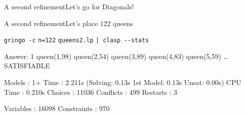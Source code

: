 \begin{frame}[fragile]{A second refinement}{Let's go for Diagonals!}
\begin{block}{}


\end{block}
\end{frame}
\begin{frame}[fragile]{A second refinement}{Let's place \alert{$122$} queens}
\begin{block}{\alert<1>{\lstinline{gringo -c} \alert{\lstinline{n=122}} \lstinline{queens2.lp} \lstinline{| clasp --stats}}}
\vspace*{-3mm}
\pause\footnotesize%
\begin{semiverbatim}
Answer: 1
queen(1,98) queen(2,54) queen(3,89) queen(4,83) queen(5,59) \dots{}
SATISFIABLE

Models      : 1+
\alert<2>{Time        : 2.211s} (Solving: 0.13s 1st Model: 0.13s Unsat: 0.00s)
CPU Time    : 0.210s
Choices     : 11036
\alert<2>{Conflicts   : 499}
Restarts    : 3

\alert<3>{Variables   : 16098}
\alert<3>{Constraints : 970}
\end{semiverbatim}
\end{block}
\end{frame}
